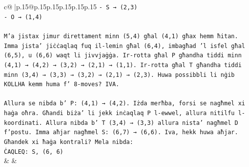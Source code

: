 \documentclass{article}
\begin{document}
{\begin{supertabular}{c@{$\;$}|p{.15\linewidth}@{}p{.15\linewidth}p{.15\linewidth}p{.15\linewidth}p{.15\linewidth}p{.15\linewidth}}
{{{\texttt{{-} S → (2,3)} \\
\texttt{{-} O → (1,4)} \\
\\ 
\texttt{M'a jistax jimur direttament minn (5,4) għal (4,1) għax hemm ħitan. Imma jista' jiċċaqlaq fuq il{-}lemin għal (6,4), imbagħad 'l isfel għal (6,5), u (6,6) waqt li jivvjaġġa. Ir{-}rotta għal P għandha tiddi minn (4,1) → (4,2) → (3,2) → (2,1) → (1,1). Ir{-}rotta għal T għandha tiddi minn (3,4) → (3,3) → (3,2) → (2,1) → (2,3). Huwa possibbli li nġib KOLLHA kemm huma f' 8{-}moves? IVA.} \\
\\ 
\texttt{Allura se nibda b' P: (4,1) → (4,2). Iżda merħba, forsi se nagħmel xi haġa oħra. Għandi biża' li jekk inċaqlaq P l{-}ewwel, allura nitilfu l{-}koordinati. Allura nibda b' T (3,4) → (3,3) allura nista' nagħmel D f'postu. Imma aħjar nagħmel S: (6,7) → (6,6). Iva, hekk huwa aħjar. Għandek xi ħaġa kontrali? Mela nibda:} \\
\texttt{ĊAQLEQ: S, (6, 6)} \\
            }
        }
    }
    & & \\ \\


\end{supertabular}}
\end{document}
